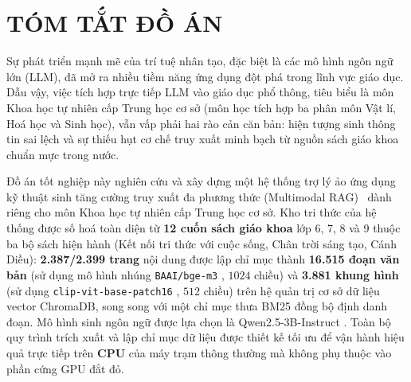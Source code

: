 \chapter*{TÓM TẮT ĐỒ ÁN}

Sự phát triển mạnh mẽ của trí tuệ nhân tạo, đặc biệt là các mô hình ngôn ngữ lớn (LLM), đã mở ra nhiều tiềm năng ứng dụng đột phá trong lĩnh vực giáo dục. Dẫu vậy, việc tích hợp trực tiếp LLM vào giáo dục phổ thông, tiêu biểu là môn Khoa học tự nhiên cấp Trung học cơ sở (môn học tích hợp ba phân môn Vật lí, Hoá học và Sinh học), vẫn vấp phải hai rào cản căn bản: hiện tượng sinh thông tin sai lệch và sự thiếu hụt cơ chế truy xuất minh bạch từ nguồn sách giáo khoa chuẩn mực trong nước.

Đồ án tốt nghiệp này nghiên cứu và xây dựng một hệ thống trợ lý ảo ứng dụng kỹ thuật sinh tăng cường truy xuất đa phương thức (Multimodal RAG)~\cite{lewis2020retrieval} dành riêng cho môn Khoa học tự nhiên cấp Trung học cơ sở. Kho tri thức của hệ thống được số hoá toàn diện từ \textbf{12 cuốn sách giáo khoa} lớp 6, 7, 8 và 9 thuộc ba bộ sách hiện hành (Kết nối tri thức với cuộc sống, Chân trời sáng tạo, Cánh Diều): \textbf{2.387/2.399 trang} nội dung được lập chỉ mục thành \textbf{16.515 đoạn văn bản} (sử dụng mô hình nhúng \texttt{BAAI/bge-m3} \cite{chen2024bgem3}, $1024$ chiều) và \textbf{3.881 khung hình} (sử dụng \texttt{clip-vit-base-patch16} \cite{radford2021clip}, $512$ chiều) trên hệ quản trị cơ sở dữ liệu vector ChromaDB, song song với một chỉ mục thưa BM25 \cite{robertson2009bm25} đồng bộ định danh đoạn. Mô hình sinh ngôn ngữ được lựa chọn là Qwen2.5-3B-Instruct \cite{qwen25_2024}. Toàn bộ quy trình trích xuất và lập chỉ mục dữ liệu được thiết kế tối ưu để vận hành hiệu quả trực tiếp trên \textbf{CPU} của máy trạm thông thường mà không phụ thuộc vào phần cứng GPU đắt đỏ.

